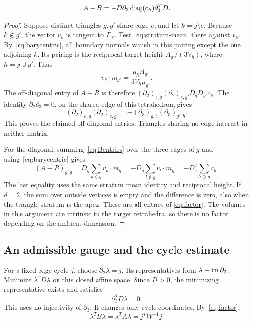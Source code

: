 \begin{lemma}\label{lem:factor}
\begin{equation}\label{eq:factor}
 A-B=-D\partial_3\operatorname{diag}(c_h)\partial_3^TD.
\end{equation}
\end{lemma}
\begin{proof}
Suppose distinct triangles $g,g'$ share edge $e$, and let $k=g\setminus e$.
Because $k\notin g'$, the vector $v_k$ is tangent to $\Gamma_{g'}$.
Test~\eqref{eq:stratum-mean} there against $v_k$.
By~\eqref{eq:barycentric}, all boundary normals vanish in this pairing except
the one adjoining $k$. Its pairing is the reciprocal target height
$A_{g'}/(3V_h)$, where $h=g\cup g'$. Thus
\[
 v_k\cdot m_{g'}=\frac{\mu_hA_{g'}}{3V_h\mu_{g'}}.
\]
The off-diagonal entry of $A-B$ is therefore
$(\partial_2)_{e,g}(\partial_2)_{e,g'}D_gD_{g'}c_h$.
The identity $\partial_2\partial_3=0$, on the shared edge of this tetrahedron,
gives
\[
 (\partial_2)_{e,g}(\partial_2)_{e,g'}
 =-(\partial_3)_{g,h}(\partial_3)_{g',h}.
\]
This proves the claimed off-diagonal entries. Triangles sharing no edge
interact in neither matrix.

For the diagonal, summing~\eqref{eq:Bentries} over the three edges of $g$
and using~\eqref{eq:barycentric} gives
\[
 (A-B)_{g,g}
 =D_g\sum_{k\in g}v_k\cdot m_g
 =-D_g\sum_{l\notin g}v_l\cdot m_g
 =-D_g^2\sum_{h\supset g}c_h.
\]
The last equality uses the same stratum mean identity and reciprocal height.
If $d=2$, the sum over outside vertices is empty and the difference is zero,
also when the triangle stratum is the apex. These are all entries of
\eqref{eq:factor}. The volumes in this argument are intrinsic to the target
tetrahedra, so there is no factor depending on the ambient dimension.
\end{proof}

\subsection{An admissible gauge and the cycle estimate}
For a fixed edge cycle $j$, choose $\partial_2\lambda=j$.
Its representatives form $\lambda+\operatorname{im}\partial_3$. Minimize
$\lambda^TD\lambda$ on this closed affine space. Since $D>0$, the minimizing
representative exists and satisfies
\begin{equation}\label{eq:gauge}
 \partial_3^TD\lambda=0.
\end{equation}
This uses no injectivity of $\partial_3$. It changes only cycle coordinates.
By~\eqref{eq:factor},
\begin{equation}\label{eq:gauge-equality}
 \lambda^TB\lambda=\lambda^TA\lambda=j^TW^{-1}j.
\end{equation}

